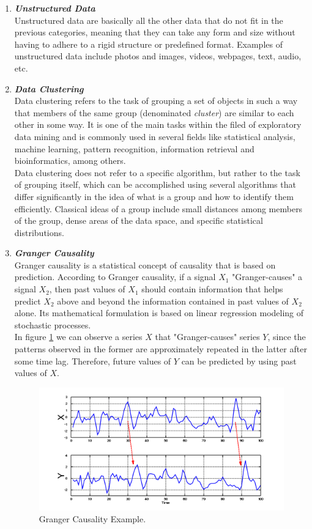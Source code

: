 \documentclass{article}
\begin{document}
\begin{enumerate}[label=(\alph*)]
\begin{enumerate}[label=\textbf{\arabic*.}]
            \item \textbf{\textit{Unstructured Data}}\\
Unstructured data are basically all the other data that do not fit in the previous categories, meaning that they can take any form and size without having to adhere to a rigid structure or predefined format. Examples of unstructured data include photos and images, videos, webpages, text, audio, etc.
            
            \item \textbf{\textit{Data Clustering}}\\
Data clustering refers to the task of grouping a set of objects in such a way that members of the same group (denominated \emph{cluster}) are similar to each other in some way. It is one of the main tasks within the filed of exploratory data mining and is commonly used in several fields like statistical analysis, machine learning, pattern recognition, information retrieval and bioinformatics, among others.\\
Data clustering does not refer to a specific algorithm, but rather to the task of grouping itself, which can be accomplished using several algorithms that differ significantly in the idea of what is a group and how to identify them efficiently. Classical ideas of a group include small distances among members of the group, dense areas of the data space, and specific statistical distributions.
            
            \item \textbf{\textit{Granger Causality}}\\
Granger causality is a statistical concept of causality that is based on prediction. According to Granger causality, if a signal $X_1$ "Granger-causes" a signal $X_2$, then past values of $X_1$ should contain information that helps predict $X_2$ above and beyond the information contained in past values of $X_2$ alone. Its mathematical formulation is based on linear regression modeling of stochastic processes.\\
In figure \ref{granger} we can observe a series $X$ that "Granger-causes" series $Y$, since the patterns observed in the former are approximately repeated in the latter after some time lag. Therefore, future values of $Y$ can be predicted by using past values of $X$.
	\begin{figure}[ht]
		\centering
		\includegraphics[width=0.75\linewidth]{granger.png}
		\caption{Granger Causality Example.}
		\label{granger}
	\end{figure}
            

\end{enumerate}
\end{enumerate}
\end{document}
